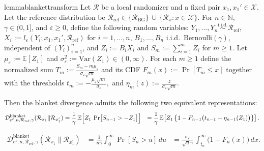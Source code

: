 \documentclass{article}
\theoremstyle{plain}
\theoremstyle{definition}
\begin{document}
\begin{restatable}{lemma}{blankettransform}
\label{lem:blanket-transform}
Let $\mathcal{R}$ be a local randomizer and a fixed pair
$x_1,x_1' \in \mathcal X$.
Let the reference distribution be
$
  \mathcal R_{\mathrm{ref}}
  \in
  \bigl\{\mathcal R_{\mathrm{BG}}\bigr\}
  \,\cup\,
  \bigl\{\mathcal R_x : x\in\mathcal X\bigr\}.
$
For $n\in\mathbb N$, $\gamma\in(0,1]$, and $\varepsilon\geq 0$, define the
following random variables:
  $Y_1,\dots,Y_n\stackrel{\mathrm{i.i.d.}}{\sim}\mathcal R_{\mathrm{ref}}$,
  $X_i := l_{\varepsilon}(Y_i;x_1,x_1',\mathcal R_{\mathrm{ref}})$
    for $i=1,\dots,n$,
  $B_1,\dots,B_n$ i.i.d.\ $\mathrm{Bernoulli}(\gamma)$, independent of
    $(Y_i)_{i=1}^n$,
    and
  $Z_i := B_i X_i$ and $S_m := \sum_{i=1}^m Z_i$ for $m\ge1$.
Let
$
  \mu_\varepsilon := \mathbb E[Z_1]
$ and
$
  \sigma_\varepsilon^2 := \mathrm{Var}(Z_1)\in(0,\infty).
$
For each $m\ge1$ define the normalized sum
$
  T_m
  := \frac{S_m - m\mu_\varepsilon}{\sigma_\varepsilon\sqrt{m}}
$
and its CDF
$
  F_m(x) := \Pr\left[T_m\le x\right]
$
together with the thresholds
$
  t_m := -\frac{\mu_\varepsilon\sqrt{m}}{\sigma_\varepsilon},
  $
and
$
  \eta_m(z) := \frac{z}{\sigma_\varepsilon\sqrt{m}}.
$

Then the blanket divergence admits the following two equivalent representations:
  \begin{equation}
    \label{eq:blanket-transform-i}
    \begin{aligned}
    \mathcal D^{\mathrm{blanket}}_{e^{\varepsilon},n,\mathcal R_{\mathrm{ref}},\gamma}(
      \mathcal{R}_{x_1} \| \mathcal{R}_{x_1^\prime})
    &= \frac{1}{\gamma}\,
       \mathbb E\Bigl[
         Z_1\,
         \Pr\bigl[
           S_{n-1} > -Z_1
         \bigr]
       \Bigr] 
    &= \frac{1}{\gamma}\,
       \mathbb E\!\left[
         Z_1\,
         \bigl\{
           1 - F_{n-1}\bigl(t_{n-1} - \eta_{n-1}(Z_1)\bigr)
         \bigr\}
       \right].
    \end{aligned}
  \end{equation}

  \begin{equation}
    \label{eq:blanket-transform-ii}
    \begin{aligned}
    \mathcal D^{\mathrm{blanket}}_{e^{\varepsilon},n,\mathcal R_{\mathrm{ref}},\gamma}(
      \mathcal{R}_{x_1} \| \mathcal{R}_{x_1^\prime})
    &= \frac{1}{n\gamma}
       \int_0^\infty
         \Pr[S_n>u]\,du 
    &= \frac{\sigma_\varepsilon}{\sqrt{n}\gamma}\,
       \int_{t_n}^\infty \bigl(1-F_n(x)\bigr)\,dx.
    \end{aligned}
  \end{equation}
\end{restatable}
\end{document}
